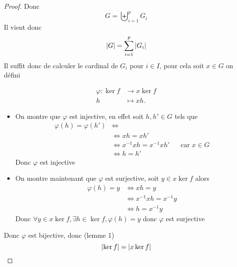 \documentclass[11pt,colorlinks]{book}
\theoremstyle{mytheoremstyle}
\theoremstyle{mytheoremstyle}
\theoremstyle{mytheoremstyle}
\theoremstyle{mytheoremstyle}
\theoremstyle{mytheoremstyle}
\theoremstyle{mytheoremstyle}
\theoremstyle{mytheoremstyle}
\theoremstyle{mytheoremstyle}
\theoremstyle{myproblemstyle}
\newcommand{\vfunc}[5]{
  \begin{align*}
    #1 \colon #2 &\to #3\\
    #4 &\mapsto #5.
  \end{align*}
}
\begin{document}
\begin{theorem}
\begin{proof}
    Donc 
    \begin{equation*}
      G = \biguplus_{i=1}^p G_i
    \end{equation*}
    Il vient donc 
    \begin{equation*}
      \abs{G} = \sum_{i=1}^p \abs{G_i}
    \end{equation*}
    Il suffit donc de calculer le cardinal de $G_i$ pour $i \in I$, pour cela soit $x \in G$ on défini 
    \vfunc{\varphi}{\ker f}{x\ker f}{h}{xh}
    \begin{itemize}
      \item On montre que $\varphi$ est injective, en effet soit $h,h' \in G$ tels que 
      \begin{align*}
        \varphi(h) = \varphi(h') &\Leftrightarrow \\ 
        &\Leftrightarrow xh = xh' \\
        &\Leftrightarrow x^{-1}xh = x^{-1}xh' && \text{car } x \in G \\ 
        &\Leftrightarrow h=h'
      \end{align*}
      Donc $\varphi$ est injective
      \item On montre maintenant que $\varphi$ est surjective, soit $y \in x\ker f$ alors 
      \begin{align*}
        \varphi(h) = y &\Leftrightarrow xh = y \\ 
        &\Leftrightarrow x^{-1}xh = x^{-1}y \\ 
        &\Leftrightarrow h = x^{-1}y
      \end{align*}
      Donc $\forall y \in x\ker f, \exists h \in \ker f, \varphi(h) = y$ donc $\varphi$ est surjective
    \end{itemize}
    Donc $\varphi$ est bijective, donc (lemme 1)
    \begin{equation*}
      \abs{\ker f} = \abs{x\ker f}
    \end{equation*}
    

\end{proof}
\end{theorem}
\end{document}
